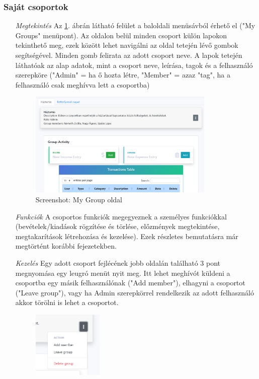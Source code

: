 \subsubsection{Saját csoportok}
\begin{itemize}
	\item[\emph{Megtekintés}]	 Az \ref{fig:group}. ábrán látható felület a baloldali menüsávból érhető el ("My Groups" menüpont). Az oldalon belül minden csoport külön lapokon tekinthető meg, ezek között lehet navigálni az oldal tetején lévő gombok segítségével. Minden gomb felirata az adott csoport neve. A lapok tetején láthatóak az alap adatok, mint a csoport neve, leírása, tagok és a felhasználó szerepköre ("Admin" = ha ő hozta létre, "Member" = azaz "tag", ha a felhasználó csak meghívva lett a csoportba)
	\begin{figure}[H]
		\centering
		\includegraphics[height=190px]{img/group}
		\caption{Screenshot: My Group oldal}
		\label{fig:group}
	\end{figure}
		\item[\emph{Funkciók}] A csoportos funkciók megegyeznek a személyes funkciókkal (bevételek/kiadások rögzítése és törlése, előzmények megtekintése, megtakarítások létrehozása és kezelése). Ezek részletes bemutatásra már megtörtént korábbi fejezetekben.
	\item[\emph{Kezelés}] Egy adott csoport fejlécének jobb oldalán található 3 pont megnyomása egy leugró menüt nyit meg. Itt lehet meghívót küldeni a csoportba egy másik felhasználónak ("Add member"), elhagyni a csoportot ("Leave group"), vagy ha Admin szerepkörrel rendelkezik az adott felhasználó akkor törölni is lehet a csoportot.
	\begin{figure}[H]
		\centering
		\includegraphics[height=120px]{img/group-actions}

\end{figure}
\end{itemize}
